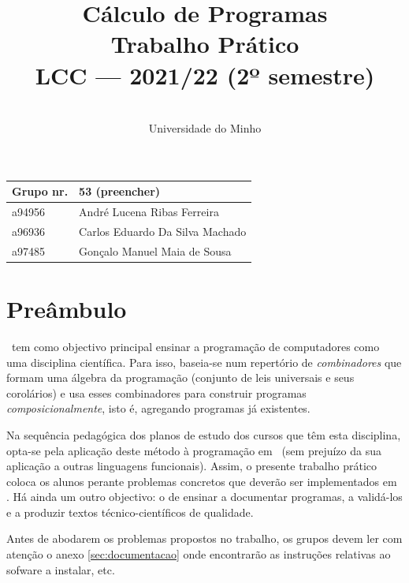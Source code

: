 \documentclass[a4paper]{article}
\title{
          Cálculo de Programas
\\
          Trabalho Prático
\\
          LCC --- 2021/22 (2º semestre)
}
\author{
          \dium
\\
          Universidade do Minho
}
\date\mydate
\begin{document}
\maketitle

\begin{center}\large
\begin{tabular}{ll}
\textbf{Grupo} nr. & 53 (preencher)
\\\hline
a94956 & André Lucena Ribas Ferreira
\\
a96936 & Carlos Eduardo Da Silva Machado
\\
a97485 & Gonçalo Manuel Maia de Sousa
\end{tabular}
\end{center}

\section{Preâmbulo}

\CP\ tem como objectivo principal ensinar
a progra\-mação de computadores como uma disciplina científica. Para isso,
baseia-se num repertório de \emph{combinadores} que formam uma álgebra da
programação (conjunto de leis universais e seus corolários) e usa esses
combinadores para construir programas \emph{composicionalmente}, isto é,
agregando programas já existentes.

Na sequência pedagógica dos planos de estudo dos cursos que têm
esta disciplina, opta-se pela aplicação deste método à programação
em \Haskell\ (sem prejuízo da sua aplicação a outras linguagens
funcionais). Assim, o presente trabalho prático coloca os
alunos perante problemas concretos que deverão ser implementados em
\Haskell.  Há ainda um outro objectivo: o de ensinar a documentar
programas, a validá-los e a produzir textos técnico-científicos de
qualidade.

Antes de abodarem os problemas propostos no trabalho, os grupos devem ler
com atenção o anexo \ref{sec:documentacao} onde encontrarão as instruções
relativas ao sofware a instalar, etc.


\Problema
\end{document}
